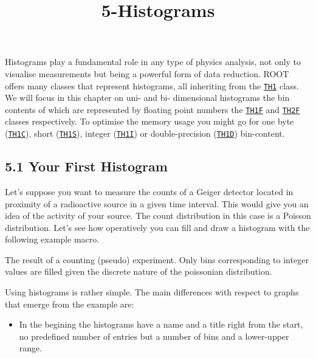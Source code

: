 \documentclass{article}
\title{5-Histograms}
\providecommand{\tightlist}{%
      \setlength{\itemsep}{0pt}\setlength{\parskip}{0pt}}
\begin{document}
    
    
    \maketitle
    
    

    
    Histograms play a fundamental role in any type of physics analysis, not
only to visualise measurements but being a powerful form of data
reduction. ROOT offers many classes that represent histograms, all
inheriting from the
\href{https://root.cern.ch/doc/master/classTH1.html}{\texttt{TH1}}
class. We will focus in this chapter on uni- and bi- dimensional
histograms the bin contents of which are represented by floating point
numbers the
\href{https://root.cern.ch/doc/master/classTH1F.html}{\texttt{TH1F}} and
\href{https://root.cern.ch/doc/master/classTH2F.html}{\texttt{TH2F}}
classes respectively. To optimise the memory usage you might go for one
byte
(\href{https://root.cern.ch/doc/master/classTH1C.html}{\texttt{TH1C}}),
short
(\href{https://root.cern.ch/doc/master/classTH1S.html}{\texttt{TH1S}}),
integer
(\href{https://root.cern.ch/doc/master/classTH1I.html}{\texttt{TH1I}})
or double-precision
(\href{https://root.cern.ch/doc/master/classTH1D.html}{\texttt{TH1D}})
bin-content.

\subsection{5.1 Your First Histogram}\label{your-first-histogram}

Let's suppose you want to measure the counts of a Geiger detector
located in proximity of a radioactive source in a given time interval.
This would give you an idea of the activity of your source. The count
distribution in this case is a Poisson distribution. Let's see how
operatively you can fill and draw a histogram with the following example
macro.

The result of a counting (pseudo) experiment. Only bins corresponding to
integer values are filled given the discrete nature of the poissonian
distribution.

Using histograms is rather simple. The main differences with respect to
graphs that emerge from the example are:

\begin{itemize}
\tightlist
\item
  In the begining the histograms have a name and a title right from the
  start, no predefined number of entries but a number of bins and a
  lower-upper range.
\end{itemize}
\end{document}
